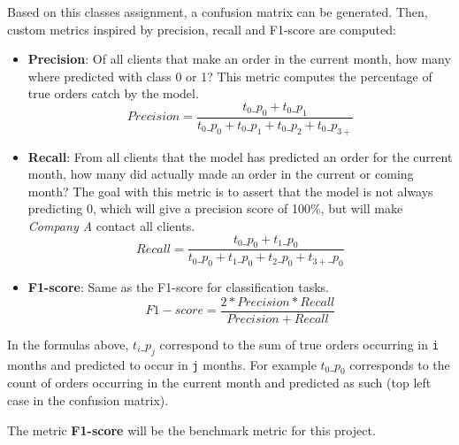 \begin{center}
\end{center}

Based on this classes assignment, a confusion matrix can be generated. Then, custom metrics inspired by precision, recall and F1-score are computed:
\begin{itemize}
    \item \textbf{Precision}: Of all clients that make an order in the current month, how many where predicted with class 0 or 1? This metric computes the percentage of true orders catch by the model. $$ Precision = \frac{t_0\_p_0 + t_0\_p_1}{t_0\_p_0 + t_0\_p_1 + t_0\_p_2 + t_0\_p_{3+}} $$
    
    \item \textbf{Recall}: From all clients that the model has predicted an order for the current month, how many did actually made an order in the current or coming month? The goal with this metric is to assert that the model is not always predicting 0, which will give a precision score of 100\%, but will make \textit{Company A} contact all clients. $$ Recall = \frac{t_0\_p_0 + t_1\_p_0}{t_0\_p_0 + t_1\_p_0 + t_2\_p_0 + t_{3+}\_p_0} $$
    
    \item \textbf{F1-score}: Same as the F1-score for classification tasks. $$ F1-score = \frac{2*Precision*Recall}{Precision+Recall} $$
\end{itemize}

In the formulas above, $t_i\_p_j$ correspond to the sum of true orders occurring in \texttt{i} months and predicted to occur in \texttt{j} months. For example $t_0\_p_0$ corresponds to the count of orders occurring in the current month and predicted as such (top left case in the confusion matrix).

The metric \textbf{F1-score} will be the benchmark metric for this project.

